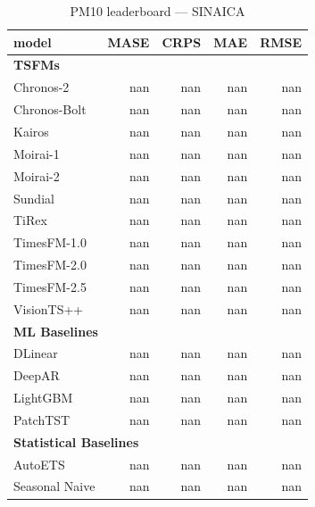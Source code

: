 \begin{table}[H]
\caption{PM10 leaderboard --- SINAICA}
\centering
\begin{small}
\begin{tabular}{lrrrr}
\toprule
model & MASE & CRPS & MAE & RMSE \\
\midrule
\multicolumn{5}{l}{\textbf{TSFMs}} \\
Chronos-2 & nan & nan & nan & nan \\
Chronos-Bolt & nan & nan & nan & nan \\
Kairos & nan & nan & nan & nan \\
Moirai-1 & nan & nan & nan & nan \\
Moirai-2 & nan & nan & nan & nan \\
Sundial & nan & nan & nan & nan \\
TiRex & nan & nan & nan & nan \\
TimesFM-1.0 & nan & nan & nan & nan \\
TimesFM-2.0 & nan & nan & nan & nan \\
TimesFM-2.5 & nan & nan & nan & nan \\
VisionTS++ & nan & nan & nan & nan \\
\midrule
\multicolumn{5}{l}{\textbf{ML Baselines}} \\
DLinear & nan & nan & nan & nan \\
DeepAR & nan & nan & nan & nan \\
LightGBM & nan & nan & nan & nan \\
PatchTST & nan & nan & nan & nan \\
\midrule
\multicolumn{5}{l}{\textbf{Statistical Baselines}} \\
AutoETS & nan & nan & nan & nan \\
Seasonal Naive & nan & nan & nan & nan \\
\bottomrule
\end{tabular}
\end{small}
\end{table}